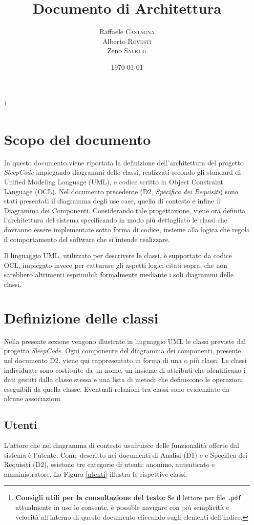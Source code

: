 \documentclass[11pt, a4paper]{article}
\title{Documento di Architettura}
\author{Raffaele \textsc{Castagna}\\
Alberto \textsc{Rovesti}\\
Zeno \textsc{Saletti}}
\date{\today}
\theoremstyle{definition} %
\newcommand\blfootnote[1]{%
  \begingroup
  \renewcommand\thefootnote{}\footnote{#1}%
  \addtocounter{footnote}{-1}%
  \endgroup
}
\begin{document}


\tableofcontents\blfootnote{\textbf{Consigli utili per la consultazione del testo:} Se il lettore per file \texttt{.pdf} attualmente in uso lo consente, è possible navigare con più semplicità e velocità all'interno di questo documento cliccando sugli elementi dell'indice.}

\newpage

\section*{Scopo del documento}
In questo documento viene riportata la definizione dell'architettura del
progetto \textit{SleepCode} impiegando diagrammi delle classi, realizzati
secondo gli standard di Unified Modeling Language (UML), e codice scritto in Object
Constraint Language (OCL). Nel documento precedente (D2, \textit{Specifica
dei Requisiti}) sono stati presentati il diagramma degli use case, quello
di contesto e infine il Diagramma dei Componenti. Considerando tale
progettazione, viene ora definita l'architettura del sistema specificando
in modo più dettagliato le classi che dovranno essere implementate sotto forma di
codice, insieme alla logica che regola il comportamento del software che
si intende realizzare.

Il linguaggio UML, utilizzato per descrivere le classi, è supportato da
codice OCL, impiegato invece per catturare gli aspetti logici citati sopra,
che non sarebbero altrimenti esprimibili formalmente mediante i soli diagrammi delle
classi.


\newpage
\section{Definizione delle classi}
Nella presente sezione vengono illustrate in linguaggio UML le classi
previste dal progetto \textit{SleepCode}. Ogni componente del diagramma
dei componenti, presente nel documento D2, viene qui rappresentato
in forma di una o più classi. Le classi individuate sono costituite
da un nome, un insieme di attributi che identificano i dati gestiti dalla
classe stessa e una lista di metodi che definiscono le operazioni
eseguibili da quella classe. Eventuali relazioni tra classi sono evidenziate
da alcune associazioni.

\subsection{Utenti}
L'attore che nel diagramma di contesto usufruisce delle funzionalità offerte
dal sistema è l'utente. Come descritto nei documenti di Analisi (D1) e
e Specifica dei Requisiti (D2), esistono tre categorie di utenti: anonimo, autenticato
e amministratore. La Figura \ref{utenti} illustra le rispettive classi.
\end{document}
